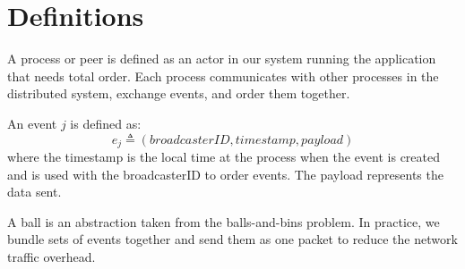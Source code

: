 \section{Definitions}
\label{sec:definitions}

A process or peer is defined as an actor in our system running the application that needs total order. Each process communicates with other processes in the distributed system, exchange events, and order them together.  
\par
An event $j$ is defined as: $$e_j \triangleq (broadcasterID,timestamp,payload)$$ where the timestamp is the local time at the process when the event is created and is used with the broadcasterID to order events. The payload represents the data sent. %
\par
A ball is an abstraction taken from the balls-and-bins problem. In practice, we bundle sets of events together and send them as one packet to reduce the network traffic overhead.

